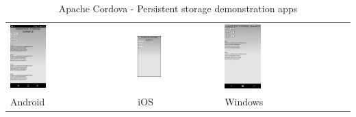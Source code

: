 \documentclass[english,master,public,dept460,male,cpdeclaration,oneside]{diploma}
\begin{document}
\begin{table}[!h]
	\centering
	\caption{Apache Cordova - Persistent storage demonstration apps}
	\label{table:uis}
	\begin{tabular}{p{5cm} | p{5cm} | p{5cm} }
		\toprule		
		\includegraphics[width=0.3\textwidth]{Figures/cordova2android.PNG}
		& \includegraphics[width=0.3\textwidth]{Figures/cordova2ios.PNG}
		& \includegraphics[width=0.3\textwidth]{Figures/cordova2windows.PNG}
		\\
		Android & iOS & Windows \\
		\midrule
	\end{tabular}
\end{table}
\end{document}
